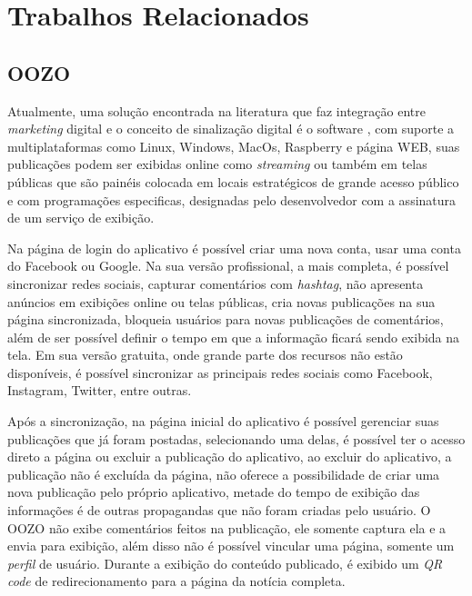 \chapter[Trabalhos Relacionados]{Trabalhos Relacionados}

\section{OOZO}
\label{sec:oozo}

Atualmente, uma solução encontrada na literatura que faz integração entre \textit{marketing} digital e o conceito de sinalização digital é o software \cite{oozo2017}, com suporte a multiplataformas como Linux, Windows, MacOs, Raspberry e página WEB, suas publicações podem ser exibidas online como \textit{streaming} ou também em telas públicas que são painéis colocada em locais estratégicos de grande acesso público e com programações especificas, designadas pelo desenvolvedor com a assinatura de um serviço de exibição.

Na página de login do aplicativo é possível criar uma nova conta, usar uma conta do Facebook ou Google. Na sua versão profissional, a mais completa, é possível sincronizar redes sociais, capturar comentários com \textit{hashtag}, não apresenta anúncios em exibições online ou telas públicas, cria novas publicações na sua página sincronizada, bloqueia usuários para novas publicações de comentários, além de ser possível definir o tempo em que a informação ficará sendo exibida na tela. Em sua versão gratuita, onde grande parte dos recursos não estão disponíveis, é possível sincronizar as principais redes sociais como Facebook, Instagram, Twitter, entre outras. 

Após a sincronização, na página inicial do aplicativo é possível gerenciar suas publicações que já foram postadas, selecionando uma delas, é possível ter o acesso direto a página ou excluir a publicação do aplicativo, ao excluir do aplicativo, a publicação não é excluída da página, não oferece a possibilidade de criar uma nova publicação pelo próprio aplicativo, metade do tempo de exibição das informações é de outras propagandas que não foram criadas pelo usuário. O OOZO não exibe comentários feitos na publicação, ele somente captura ela e a envia para exibição, além disso não é possível vincular uma página, somente um \textit{perfil} de usuário. Durante a exibição do conteúdo publicado, é exibido um \textit{QR code} de redirecionamento para a página da notícia completa.

